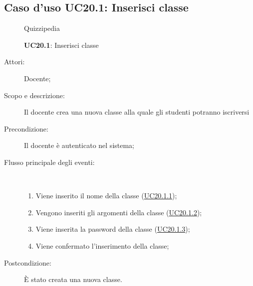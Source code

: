 \subsection{Caso d'uso UC20.1: Inserisci classe}
	\begin{figure}[H]
		\centering
		\begin{resizedtikzpicture}{\textwidth}
		\begin{umlsystem}[x=0, fill=lightgray!20]{Quizzipedia}
		\end{umlsystem}
		\end{resizedtikzpicture}
		\caption{\textbf{UC20.1}: Inserisci classe}
		\label{UC20.1}
	\end{figure}
\begin{description}
\item[Attori:] Docente;
\item[Scopo e descrizione:] Il docente crea una nuova classe alla quale gli studenti potranno iscriversi 
      \item[Precondizione:] Il docente è autenticato nel sistema;

        \item[Flusso principale degli eventi:] \ 
 \begin{enumerate}
          \item Viene inserito il nome della classe (\hyperlink{UC20.1.1}{UC20.1.1});
          \item Vengono inseriti gli argomenti della classe (\hyperlink{UC20.1.2}{UC20.1.2});
          \item Viene inserita la password della classe (\hyperlink{UC20.1.3}{UC20.1.3});
          \item Viene confermato l'inserimento della classe;

      \end{enumerate}
    \item[Postcondizione:] È stato creata una nuova classe.
  \end{description}
\hypertarget{UC20.1.1}{}
